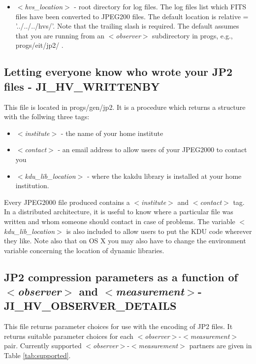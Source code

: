 \documentclass[namedreferences]{SolarPhysics}
\newcommand{\cvar}[1]{$<${\it #1}$>$}
\begin{document}
\begin{article}
\begin{itemize}
\item \cvar{hvs\_location} - root directory for log files. The log
  files list which FITS files have been converted to JPEG200
  files. The default location is relative = '../../../hvs/'.  Note
  that the trailing slash is required.  The default assumes that you
  are running from an \cvar{observer} subdirectory in progs, e.g.,
  progs/eit/jp2/ .
\end{itemize}

\subsection{Letting everyone know who wrote your JP2 files - JI\_HV\_WRITTENBY}

This file is located in progs/gen/jp2.  It is a procedure which
returns a structure with the follwing three tags:
\begin{itemize}
\item \cvar{institute} - the name of your home institute

\item \cvar{contact} - an email address to allow users of your
  JPEG2000 to contact you

\item \cvar{kdu\_lib\_location} - where the kakdu library is installed
  at your home institution.

\end{itemize}
Every JPEG2000 file produced contains a \cvar{institute} and
\cvar{contact} tag.  In a distributed architecture, it is useful to
know where a particular file was written and whom someone should
contact in case of problems.  The variable \cvar{kdu\_lib\_location}
is also included to allow users to put the KDU code wherever they
like.  Note also that on OS X you may also have to change the
environment variable concerning the location of dynamic libraries.

\subsection{JP2 compression parameters as a function of
  \cvar{observer} and \cvar{measurement}- JI\_HV\_OBSERVER\_DETAILS}

This file returns parameter choices for use with the encoding of JP2
files.  It returns suitable parameter choices for each
\cvar{observer}-\cvar{measurement} pair.  Currently supported
\cvar{observer}-\cvar{measurement} partners are given in Table
\ref{tab:supported}. 


\end{article}
\end{document}
